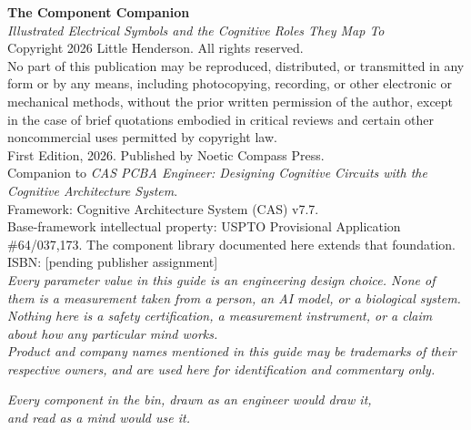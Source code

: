\thispagestyle{empty}
\vspace*{\fill}
\begin{center}
\begin{minipage}{0.85\textwidth}
\small
\noindent
\textbf{The Component Companion}\\
\textit{Illustrated Electrical Symbols and the Cognitive Roles They Map To}\\[6pt]
Copyright \textcopyright{} 2026 Little Henderson. All rights reserved.\\[6pt]
No part of this publication may be reproduced, distributed, or transmitted in
any form or by any means, including photocopying, recording, or other electronic
or mechanical methods, without the prior written permission of the author, except
in the case of brief quotations embodied in critical reviews and certain other
noncommercial uses permitted by copyright law.\\[6pt]
First Edition, 2026. Published by Noetic Compass Press.\\[6pt]
Companion to \textit{CAS PCBA Engineer: Designing Cognitive Circuits with the
Cognitive Architecture System}.\\[6pt]
Framework: Cognitive Architecture System (CAS) v7.7.\\[6pt]
Base-framework intellectual property: USPTO Provisional Application
\#64/037,173. The component library documented here extends that foundation.\\[6pt]
ISBN: [pending publisher assignment]\\[6pt]
\textit{Every parameter value in this guide is an engineering design choice. None
of them is a measurement taken from a person, an AI model, or a biological
system. Nothing here is a safety certification, a measurement instrument, or a
claim about how any particular mind works.}\\[6pt]
\textit{Product and company names mentioned in this guide may be trademarks of
their respective owners, and are used here for identification and commentary
only.}
\end{minipage}
\end{center}
\vspace*{\fill}
\cleardoublepage

\thispagestyle{empty}
\vspace*{2.6in}
\begin{center}
\begin{minipage}{0.74\textwidth}
\itshape\centering
Every component in the bin, drawn as an engineer would draw it,\\
and read as a mind would use it.
\end{minipage}
\end{center}
\clearpage

